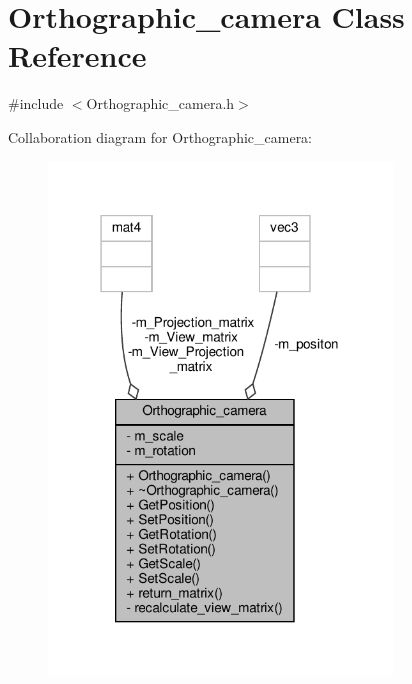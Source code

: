 \hypertarget{classOrthographic__camera}{}\section{Orthographic\+\_\+camera Class Reference}
\label{classOrthographic__camera}


{\ttfamily \#include $<$Orthographic\+\_\+camera.\+h$>$}



Collaboration diagram for Orthographic\+\_\+camera\+:
\nopagebreak
\begin{figure}[H]
\begin{center}
\leavevmode
\includegraphics[width=259pt]{classOrthographic__camera__coll__graph}
\end{center}
\end{figure}
